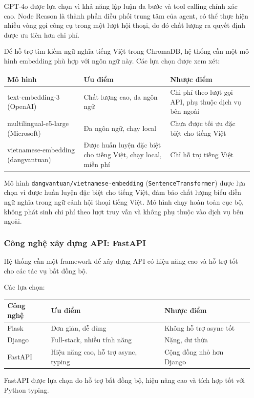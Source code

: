 GPT-4o được lựa chọn vì khả năng lập luận đa bước và tool calling chính xác cao. Node Reason là thành phần điều phối trung tâm của agent, có thể thực hiện nhiều vòng gọi công cụ trong một lượt hội thoại, do đó chất lượng ra quyết định được ưu tiên hơn chi phí.

Để hỗ trợ tìm kiếm ngữ nghĩa tiếng Việt trong ChromaDB, hệ thống cần một mô hình embedding phù hợp với ngôn ngữ này. Các lựa chọn được xem xét:

\begin{table}[H]
    \centering
    \small
    \renewcommand{\arraystretch}{1.3}
    \begin{tabular}{|p{3cm}|p{5cm}|p{5cm}|}
        \hline
        \textbf{Mô hình} & \textbf{Ưu điểm} & \textbf{Nhược điểm} \\
        \hline
        
        text-embedding-3 (OpenAI)
        & Chất lượng cao, đa ngôn ngữ
        & Chi phí theo lượt gọi API, phụ thuộc dịch vụ bên ngoài \\
        \hline
        
        multilingual-e5-large (Microsoft)
        & Đa ngôn ngữ, chạy local
        & Chưa được tối ưu đặc biệt cho tiếng Việt \\
        \hline
        
        vietnamese-embedding (dangvantuan)
        & Được huấn luyện đặc biệt cho tiếng Việt, chạy local, miễn phí
        & Chỉ hỗ trợ tiếng Việt \\
        \hline
    \end{tabular}
\end{table}

Mô hình \texttt{dangvantuan/vietnamese-embedding} (\texttt{SentenceTransformer}) được lựa chọn vì được huấn luyện đặc biệt cho tiếng Việt, đảm bảo chất lượng biểu diễn ngữ nghĩa trong ngữ cảnh hội thoại tiếng Việt. Mô hình chạy hoàn toàn cục bộ, không phát sinh chi phí theo lượt truy vấn và không phụ thuộc vào dịch vụ bên ngoài.

\subsubsection{Công nghệ xây dựng API: FastAPI}

Hệ thống cần một framework để xây dựng API có hiệu năng cao và hỗ trợ tốt cho các tác vụ bất đồng bộ.

Các lựa chọn:

\begin{tabular}{|p{2.5cm}|p{5.5cm}|p{5.5cm}|}
\hline
Công nghệ & Ưu điểm & Nhược điểm \\
\hline
Flask & Đơn giản, dễ dùng & Không hỗ trợ async tốt \\
\hline
Django & Full-stack, nhiều tính năng & Nặng, dư thừa \\
\hline
FastAPI & Hiệu năng cao, hỗ trợ async, typing & Cộng đồng nhỏ hơn Django \\
\hline
\end{tabular}

FastAPI được lựa chọn do hỗ trợ bất đồng bộ, hiệu năng cao và tích hợp tốt với Python typing.
